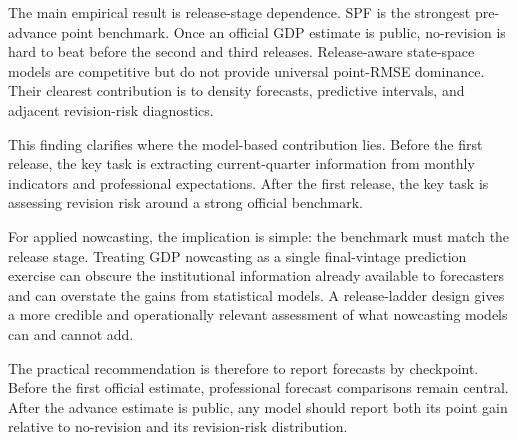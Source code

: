 \documentclass[12pt]{article}
\begin{document}
The main empirical result is release-stage dependence. SPF is the strongest pre-advance point benchmark. Once an official GDP estimate is public, no-revision is hard to beat before the second and third releases. Release-aware state-space models are competitive but do not provide universal point-RMSE dominance. Their clearest contribution is to density forecasts, predictive intervals, and adjacent revision-risk diagnostics.

This finding clarifies where the model-based contribution lies. Before the first release, the key task is extracting current-quarter information from monthly indicators and professional expectations. After the first release, the key task is assessing revision risk around a strong official benchmark.

For applied nowcasting, the implication is simple: the benchmark must match the release stage. Treating GDP nowcasting as a single final-vintage prediction exercise can obscure the institutional information already available to forecasters and can overstate the gains from statistical models. A release-ladder design gives a more credible and operationally relevant assessment of what nowcasting models can and cannot add.

The practical recommendation is therefore to report forecasts by checkpoint. Before the first official estimate, professional forecast comparisons remain central. After the advance estimate is public, any model should report both its point gain relative to no-revision and its revision-risk distribution.
\end{document}
